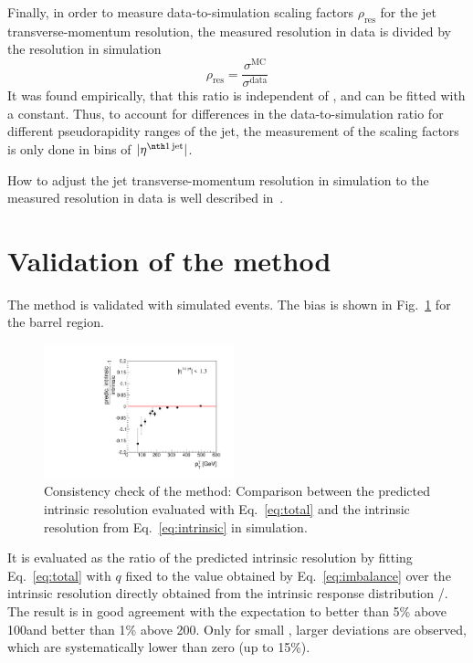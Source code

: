 Finally, in order to measure data-to-simulation scaling factors $\rho_{\text{res}}$ for the jet transverse-momentum resolution, the measured resolution in data is divided by the resolution in simulation
\begin{equation}
\rho_{\text{res}} = \frac{\sigma^{\text{MC}}}{\sigma^{\text{data}}}
\end{equation}
It was found empirically, that this ratio is independent of \ptgamma, and can be fitted with a constant.
Thus, to account for differences in the data-to-simulation ratio for different pseudorapidity ranges of the jet, the measurement of the scaling factors is only done in bins of $|\etafirstjet|$.

How to adjust the jet transverse-momentum resolution in simulation to the measured resolution in data is well described in~\cite{bib:Matthias_Thesis}.


\FloatBarrier
\section{Validation of the method}
The method is validated with simulated events. 
The bias  is shown in Fig.~\ref{fig:MCClosure} for the barrel region. 
\begin{figure}[b]
  \centering
    \includegraphics[width=0.49\textwidth]{figures/resolution/methodology/MCClosure_for_1_eta_bin_RMS99_barrel_0p2range.pdf}
  \caption{Consistency check of the method: Comparison between the predicted intrinsic resolution evaluated with Eq.~\eqref{eq:total} and the intrinsic resolution from Eq.~\eqref{eq:intrinsic} in simulation.}  
  \label{fig:MCClosure}
\end{figure}
It is evaluated as the ratio of the predicted intrinsic resolution by fitting Eq.~\eqref{eq:total} with $q$ fixed to the value obtained by Eq.~\eqref{eq:imbalance} over the intrinsic resolution directly obtained from the intrinsic response distribution \ptrecojet/\ptgenjet.
The result is in good agreement with the expectation to better than 5\% above 100\gev and better than 1\% above 200\gev.
Only for small \pt, larger deviations are observed, which are systematically lower than zero (up to 15\%).

